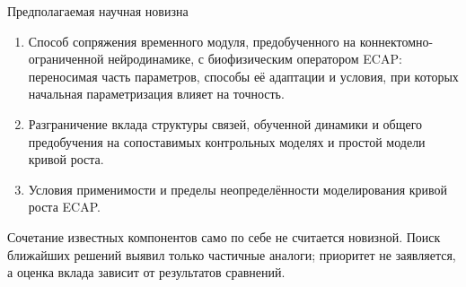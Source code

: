 \begin{frame}{Предполагаемая научная новизна}
\begin{enumerate}
\item Способ сопряжения временного модуля, предобученного на коннектомно-ограниченной нейродинамике, с биофизическим оператором ECAP: переносимая часть параметров, способы её адаптации и условия, при которых начальная параметризация влияет на точность.
\item Разграничение вклада структуры связей, обученной динамики и общего предобучения на сопоставимых контрольных моделях и простой модели кривой роста.
\item Условия применимости и пределы неопределённости моделирования кривой роста ECAP.
\end{enumerate}
\SlideGap
Сочетание известных компонентов само по себе не считается новизной. Поиск ближайших решений выявил только частичные аналоги; приоритет не заявляется, а оценка вклада зависит от результатов сравнений.
\end{frame}
